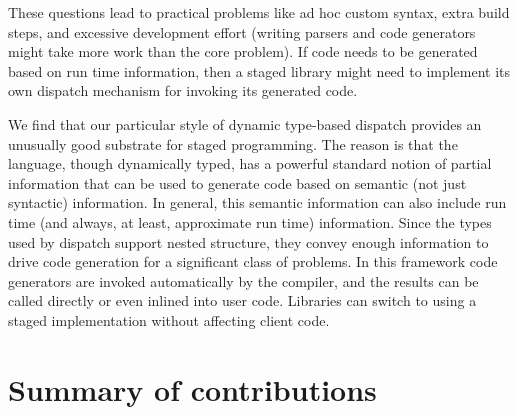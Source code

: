 \noindent
These questions lead to practical problems like ad hoc custom syntax,
extra build steps, and excessive development effort (writing parsers and
code generators might take more work than the core problem).
If code needs to be generated based on run time information, then a
staged library might need to implement its own dispatch mechanism
for invoking its generated code.

We find that our particular style of dynamic type-based dispatch provides
an unusually good substrate for staged programming.
The reason is that the language, though dynamically typed,
has a powerful standard notion of partial information that can be
used to generate code based on semantic (not just syntactic) information.
In general, this semantic information can also include run time (and
always, at least, approximate run time) information.
Since the types used by dispatch support nested structure, they
convey enough information to drive code generation for a significant
class of problems.
In this framework code generators are invoked automatically by
the compiler, and the results can be called directly or even inlined
into user code.
Libraries can switch to using a staged implementation without affecting
client code.




\section{Summary of contributions}

